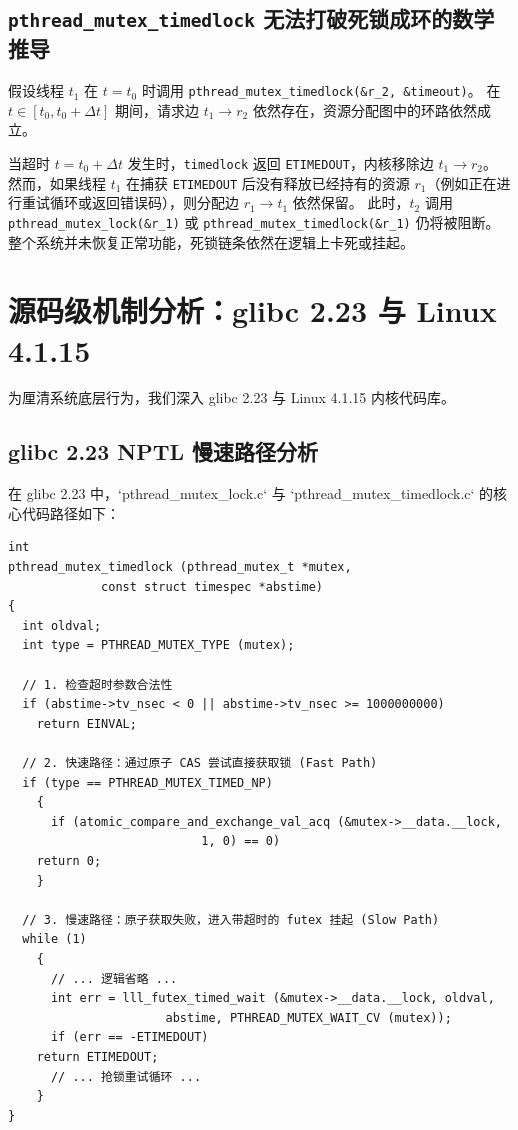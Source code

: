 \documentclass[12pt,a4paper]{article}
\begin{document}
\subsection{\texttt{pthread\_mutex\_timedlock} 无法打破死锁成环的数学推导}
假设线程 $t_1$ 在 $t = t_0$ 时调用 \texttt{pthread\_mutex\_timedlock(\&r\_2, \&timeout)}。
在 $t \in [t_0, t_0 + \Delta t]$ 期间，请求边 $t_1 \to r_2$ 依然存在，资源分配图中的环路依然成立。

当超时 $t = t_0 + \Delta t$ 发生时，\texttt{timedlock} 返回 \texttt{ETIMEDOUT}，内核移除边 $t_1 \to r_2$。
然而，如果线程 $t_1$ 在捕获 \texttt{ETIMEDOUT} 后没有释放已经持有的资源 $r_1$（例如正在进行重试循环或返回错误码），则分配边 $r_1 \to t_1$ 依然保留。
此时，$t_2$ 调用 \texttt{pthread\_mutex\_lock(\&r\_1)} 或 \texttt{pthread\_mutex\_timedlock(\&r\_1)} 仍将被阻断。整个系统并未恢复正常功能，死锁链条依然在逻辑上卡死或挂起。

\section{源码级机制分析：glibc 2.23 与 Linux 4.1.15}

为厘清系统底层行为，我们深入 glibc 2.23 与 Linux 4.1.15 内核代码库。

\subsection{glibc 2.23 NPTL 慢速路径分析}
在 glibc 2.23 中，`pthread_mutex_lock.c` 与 `pthread_mutex_timedlock.c` 的核心代码路径如下：

\begin{lstlisting}[caption={glibc 2.23 sysdeps/unix/sysv/linux/pthread\_mutex\_timedlock.c 核心逻辑代码片段}]
int
pthread_mutex_timedlock (pthread_mutex_t *mutex,
			 const struct timespec *abstime)
{
  int oldval;
  int type = PTHREAD_MUTEX_TYPE (mutex);

  // 1. 检查超时参数合法性
  if (abstime->tv_nsec < 0 || abstime->tv_nsec >= 1000000000)
    return EINVAL;

  // 2. 快速路径：通过原子 CAS 尝试直接获取锁 (Fast Path)
  if (type == PTHREAD_MUTEX_TIMED_NP)
    {
      if (atomic_compare_and_exchange_val_acq (&mutex->__data.__lock,
					       1, 0) == 0)
	return 0;
    }

  // 3. 慢速路径：原子获取失败，进入带超时的 futex 挂起 (Slow Path)
  while (1)
    {
      // ... 逻辑省略 ...
      int err = lll_futex_timed_wait (&mutex->__data.__lock, oldval,
				      abstime, PTHREAD_MUTEX_WAIT_CV (mutex));
      if (err == -ETIMEDOUT)
	return ETIMEDOUT;
      // ... 抢锁重试循环 ...
    }
}
\end{lstlisting}
\end{document}

